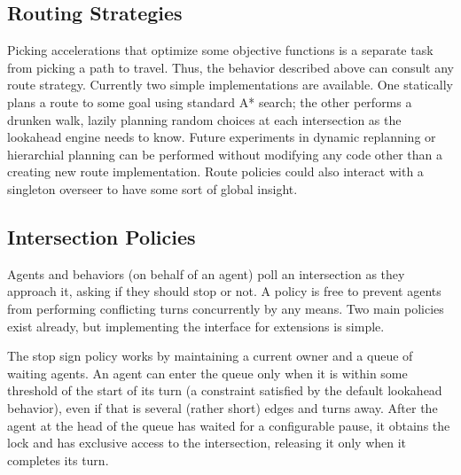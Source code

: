 \documentclass[letterpaper, 10 pt, conference]{ieeeconf}  %
\begin{document}
\commentp{Cite (and ideally use ideas from) paper commented out in latex file
}


\subsection{Routing Strategies}

Picking accelerations that optimize some objective functions is a separate task
from picking a path to travel. Thus, the behavior described above can consult
any route strategy. Currently two simple implementations are available. One
statically plans a route to some goal using standard A* search; the other
performs a drunken walk, lazily planning random choices at each intersection as
the lookahead engine needs to know. Future experiments in dynamic replanning or
hierarchial planning can be performed without modifying any code other than a
creating new route implementation. Route policies could also interact with a
singleton overseer to have some sort of global insight.

\subsection{Intersection Policies}

Agents and behaviors (on behalf of an agent) poll an intersection as they
approach it, asking if they should stop or not. A policy is free to prevent
agents from performing conflicting turns concurrently by any means. Two main
policies exist already, but implementing the interface for extensions is simple.

The stop sign policy works by maintaining a current owner and a queue of waiting
agents. An agent can enter the queue only when it is within some threshold of
the start of its turn (a constraint satisfied by the default lookahead
behavior), even if that is several (rather short) edges and turns away. After
the agent at the head of the queue has waited for a configurable pause, it obtains the lock
and has exclusive access to the intersection, releasing it only when it
completes its turn.
\end{document}

